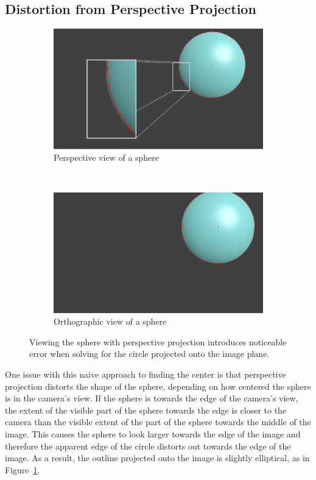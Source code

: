 \documentclass{thesis}
\begin{document}
\subsection{Distortion from Perspective Projection}
\label{sec:perspective-distortion}
\begin{figure}
	\centering
	\begin{subfigure}[b]{0.4\textwidth}
                \includegraphics[width=\textwidth]{sphere-perspective-zoom}
                \caption{Perspective view of a sphere}
    \end{subfigure}
    ~
   	\begin{subfigure}[b]{0.4\textwidth}
                \includegraphics[width=\textwidth]{sphere-ortho}
                \caption{Orthographic view of a sphere}
    \end{subfigure}
    \caption{Viewing the sphere with perspective projection introduces noticeable error when solving for the circle projected onto the image plane.}
	\label{sphere-perspective-ortho}
\end{figure}

One issue with this naive approach to finding the center is that perspective projection distorts the shape of the sphere, depending on how centered the sphere is in the camera's view. If the sphere is towards the edge of the camera's view, the extent of the visible part of the sphere towards the edge is closer to the camera than the visible extent of the part of the sphere towards the middle of the image. This causes the sphere to look larger towards the edge of the image and therefore the apparent edge of the circle distorts out towards the edge of the image. As a result, the outline projected onto the image is slightly elliptical, as in Figure~\ref{sphere-perspective-ortho}.
\end{document}
